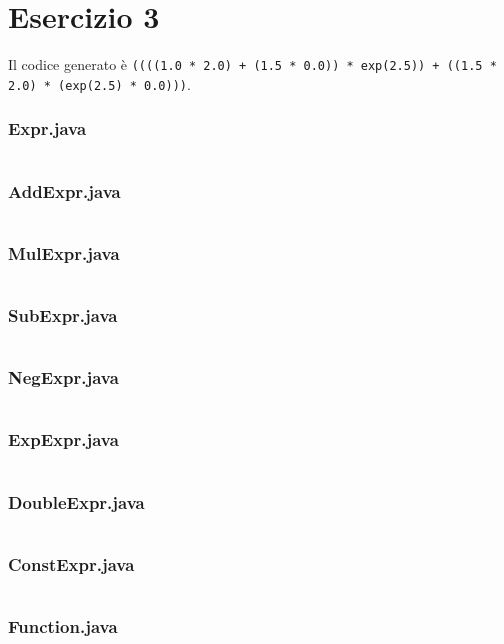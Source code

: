 \section*{Esercizio 3}

Il codice generato è \texttt{((((1.0 * 2.0) + (1.5 * 0.0)) * exp(2.5)) + ((1.5 * 2.0) * (exp(2.5) * 0.0)))}.

\subsubsection*{Expr.java}
\inputminted{java}{tex/src/3/Expr.java}

\subsubsection*{AddExpr.java}
\inputminted{java}{tex/src/3/AddExpr.java}

\subsubsection*{MulExpr.java}
\inputminted{java}{tex/src/3/MulExpr.java}

\subsubsection*{SubExpr.java}
\inputminted{java}{tex/src/3/SubExpr.java}

\subsubsection*{NegExpr.java}
\inputminted{java}{tex/src/3/NegExpr.java}

\subsubsection*{ExpExpr.java}
\inputminted{java}{tex/src/3/ExpExpr.java}

\subsubsection*{DoubleExpr.java}
\inputminted{java}{tex/src/3/DoubleExpr.java}

\subsubsection*{ConstExpr.java}
\inputminted{java}{tex/src/3/ConstExpr.java}

\subsubsection*{Function.java}
\inputminted{java}{tex/src/3/Function.java}

